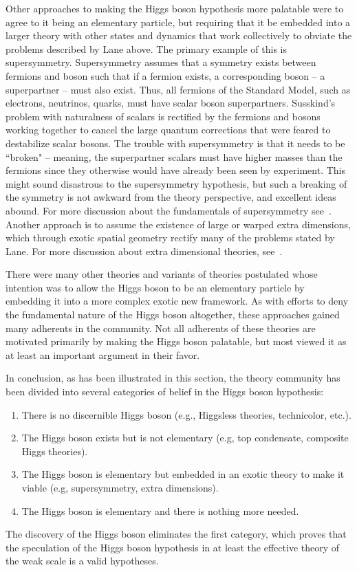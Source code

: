 \documentclass[letter,12pt]{article}
\begin{document}
Other approaches to making the Higgs boson hypothesis more palatable were to agree to it being an elementary particle, but requiring that it be embedded into a larger theory with other states and dynamics that work collectively to obviate the problems described by Lane above. The primary example of this is supersymmetry. Supersymmetry assumes that a symmetry exists between fermions and boson such that if a fermion exists, a corresponding boson -- a superpartner -- must also exist. Thus, all fermions of the Standard Model, such as electrons, neutrinos, quarks, must have scalar boson superpartners. Susskind's problem with naturalness of scalars is rectified by the fermions and bosons working together to cancel the large quantum corrections that were feared to destabilize scalar bosons. The trouble with supersymmetry is that it needs to be ``broken" -- meaning, the superpartner scalars must have higher masses than the fermions since they otherwise would have already been seen by experiment. This might sound disastrous to the supersymmetry hypothesis, but such a breaking of the symmetry is not awkward from the theory perspective, and excellent ideas abound. For more discussion about the fundamentals of supersymmetry see~\cite{Martin:1997ns}.
Another approach is to assume the existence of large or warped extra dimensions, which through exotic spatial geometry rectify many of the problems stated by Lane. For more discussion about extra dimensional theories, see~\cite{ExtraDimensionsPDG}.  

There were many other theories and variants of theories postulated whose intention was 
to allow the Higgs boson to be an elementary particle by embedding it into a more complex exotic new framework. As with efforts to deny the fundamental nature of the Higgs boson altogether, these approaches gained many adherents in the community. Not all adherents of these theories are motivated primarily by making the Higgs boson palatable, but most viewed it as at least an important argument in their favor.

In conclusion, as has been illustrated in this section, the theory community has been divided into several categories of belief in the Higgs boson hypothesis:
\begin{enumerate}
\item There is no discernible Higgs boson (e.g., Higgsless theories, technicolor, etc.).
\item The Higgs boson exists but is not elementary (e.g, top condensate, composite Higgs theories).
\item The Higgs boson is elementary but embedded in an exotic theory to make it viable (e.g, supersymmetry, extra dimensions).
\item The Higgs boson is elementary and there is nothing more needed.
\end{enumerate}
The discovery of the Higgs boson eliminates the first category, which proves that the speculation of the Higgs boson hypothesis in at least the effective theory of the weak scale is a valid hypotheses.
\end{document}
